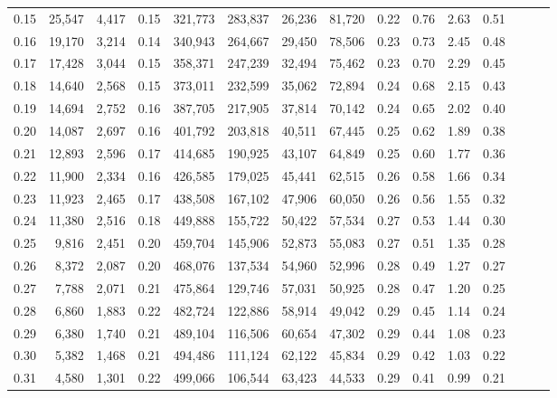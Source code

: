 \begin{tabular}{rrrrrrrrrrrrrrr}
0.15 &  25,547 &  4,417 &  0.15 &  321,773 &  283,837 &   26,236 &   81,720 &  0.22 &  0.76 &  2.63 &      0.51 \\
0.16 &  19,170 &  3,214 &  0.14 &  340,943 &  264,667 &   29,450 &   78,506 &  0.23 &  0.73 &  2.45 &      0.48 \\
0.17 &  17,428 &  3,044 &  0.15 &  358,371 &  247,239 &   32,494 &   75,462 &  0.23 &  0.70 &  2.29 &      0.45 \\
0.18 &  14,640 &  2,568 &  0.15 &  373,011 &  232,599 &   35,062 &   72,894 &  0.24 &  0.68 &  2.15 &      0.43 \\
0.19 &  14,694 &  2,752 &  0.16 &  387,705 &  217,905 &   37,814 &   70,142 &  0.24 &  0.65 &  2.02 &      0.40 \\
0.20 &  14,087 &  2,697 &  0.16 &  401,792 &  203,818 &   40,511 &   67,445 &  0.25 &  0.62 &  1.89 &      0.38 \\
0.21 &  12,893 &  2,596 &  0.17 &  414,685 &  190,925 &   43,107 &   64,849 &  0.25 &  0.60 &  1.77 &      0.36 \\
0.22 &  11,900 &  2,334 &  0.16 &  426,585 &  179,025 &   45,441 &   62,515 &  0.26 &  0.58 &  1.66 &      0.34 \\
0.23 &  11,923 &  2,465 &  0.17 &  438,508 &  167,102 &   47,906 &   60,050 &  0.26 &  0.56 &  1.55 &      0.32 \\
0.24 &  11,380 &  2,516 &  0.18 &  449,888 &  155,722 &   50,422 &   57,534 &  0.27 &  0.53 &  1.44 &      0.30 \\
0.25 &   9,816 &  2,451 &  0.20 &  459,704 &  145,906 &   52,873 &   55,083 &  0.27 &  0.51 &  1.35 &      0.28 \\
0.26 &   8,372 &  2,087 &  0.20 &  468,076 &  137,534 &   54,960 &   52,996 &  0.28 &  0.49 &  1.27 &      0.27 \\
0.27 &   7,788 &  2,071 &  0.21 &  475,864 &  129,746 &   57,031 &   50,925 &  0.28 &  0.47 &  1.20 &      0.25 \\
0.28 &   6,860 &  1,883 &  0.22 &  482,724 &  122,886 &   58,914 &   49,042 &  0.29 &  0.45 &  1.14 &      0.24 \\
0.29 &   6,380 &  1,740 &  0.21 &  489,104 &  116,506 &   60,654 &   47,302 &  0.29 &  0.44 &  1.08 &      0.23 \\
0.30 &   5,382 &  1,468 &  0.21 &  494,486 &  111,124 &   62,122 &   45,834 &  0.29 &  0.42 &  1.03 &      0.22 \\
0.31 &   4,580 &  1,301 &  0.22 &  499,066 &  106,544 &   63,423 &   44,533 &  0.29 &  0.41 &  0.99 &      0.21 \\

\end{tabular}
